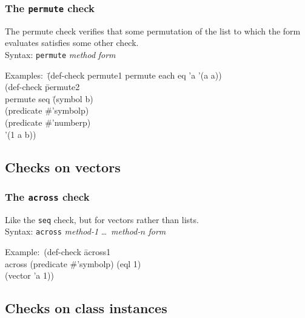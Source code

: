 \documentclass{article}
\begin{document}
\subsubsection{The \texttt{permute} check} 
The permute check verifies that some permutation of the list to which
the form evaluates satisfies some other check. 
\\ Syntax: \texttt{permute} \textit{method} \textit{form}
{\ttfamily\begin{tabbing}
\textrm{Examples:}\ \=(def-check permute1 permute each eq 'a '(a a))
\\ \> (def-check \=permute2
\\ \> \>  permute seq \=(symbol b)
\\ \> \>              \>(predicate \#'symbolp)
\\ \> \>              \>(predicate \#'numberp)
\\ \> \>'(1 a b))
\end{tabbing}}

\subsection{Checks on vectors}
\subsubsection{The \texttt{across} check} 
Like the \texttt{seq} check, but for vectors rather than lists.
\\ Syntax: \texttt{across} \textit{method-1} \ldots\ \textit{method-$n$} \textit{form}
{\ttfamily\begin{tabbing}
\textrm{Example:}\ (def-check \=across1
\\ \>  across (predicate \#'symbolp) (eql 1)
\\ \>  (vector 'a 1))
\end{tabbing}}

\subsection{Checks on class instances}
\end{document}
